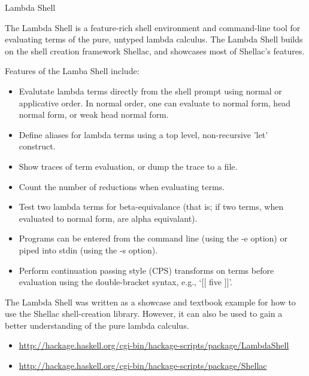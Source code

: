 \documentclass{article}
\begin{document}
\begin{hcarentry}{Lambda Shell}
\makeheader

The Lambda Shell is a feature-rich shell environment and command-line
tool for evaluating terms of the pure, untyped lambda calculus.  The Lambda
Shell builds on the shell creation framework Shellac, and showcases
most of Shellac's features.

Features of the Lamba Shell include:

\begin{itemize}
\item Evalutate lambda terms directly from the shell prompt using
      normal or applicative order.  In normal order, one can evaluate
      to normal form, head normal form, or weak head normal form.
\item Define aliases for lambda terms using a top level, non-recursive
      'let' construct.
\item Show traces of term evaluation, or dump the trace to a file.
\item Count the number of reductions when evaluating terms.
\item Test two lambda terms for beta-equivalance (that is; if two
      terms, when evaluated to normal form, are alpha equivalant).
\item Programs can be entered from the command line (using the -e option)
      or piped into stdin (using the -s option).
\item Perform continuation passing style (CPS) transforms on terms before
      evaluation using the double-bracket syntax, e.g.,  `[[ five ]]'.
\end{itemize}


The Lambda Shell was written as a showcase and textbook
example for how to use the Shellac shell-creation library.
However, it can also be used to gain a better understanding
of the pure lambda calculus.


\FurtherReading
\begin{itemize}
\item \url{http://hackage.haskell.org/cgi-bin/hackage-scripts/package/LambdaShell}
\item \url{http://hackage.haskell.org/cgi-bin/hackage-scripts/package/Shellac}
\end{itemize}
\end{hcarentry}
\end{document}
